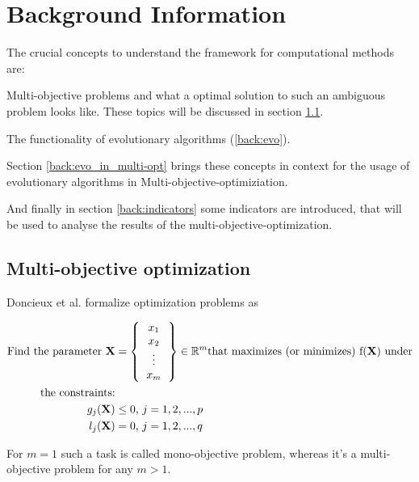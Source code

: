 \documentclass[12pt,twoside]{article}
\theoremstyle{plain}
\theoremstyle{definition}
\theoremstyle{remark}
\begin{document}
\section{Background Information}
\label{sec:background}
The crucial concepts to understand the framework for computational methods are:

Multi-objective problems and what a optimal solution to such an ambiguous problem looks like. These topics will be discussed in section \ref{back:multi-opt}.
 
The functionality of evolutionary algorithms (\ref{back:evo}).

Section \ref{back:evo_in_multi-opt} brings these concepts in context for the usage of evolutionary algorithms in Multi-objective-optimiziation.

And finally in section \ref{back:indicators} some indicators are introduced, that will be used to analyse the results of the multi-objective-optimization.

\subsection{Multi-objective optimization}
\label{back:multi-opt}
Doncieux et al. \cite{doncieux2015multi} formalize optimization problems as

\begin{align*}
	\text{Find the parameter }\textbf{X} &=
	\left \{
	\begin{tabular}{c}
		$x_1$\\
		$x_2$\\
		\vdots\\
		$x_m$
	\end{tabular}
	\right \}
	\in \mathbb{R}^m \text{that maximizes (or minimizes) f(\textbf{X}) under}\\
		 \text{the constraints:}\\
	g_j(\textbf{X}) &\le 0 \text{,  } j = 1,2,... ,p\\
	l_j(\textbf{X}) &= 0 \text{,  } j = 1,2,... ,q
\end{align*}

For $m = 1$ such a task is called mono-objective problem, whereas it's a multi-objective problem for any $m > 1$.
\end{document}
